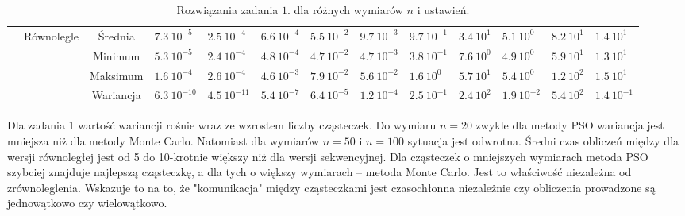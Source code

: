 \documentclass[11pt, a4paper, oneside]{article}
\begin{document}
\begin{table}[h]
\begin{adjustwidth}{-1.76cm}{}
\begin{tabular}{|c|c|c|l|l|l|l|l|l|l|l|l|l|}
                      & \multirow{4}{*}{Równolegle}   & Średnia   & $7.3 \ 10^{-5}$          & $2.5 \ 10^{-4}$         & $6.6 \ 10^{-4}$          & $5.5 \ 10^{-2}$         & $9.7 \ 10^{-3}$          & $9.7 \ 10^{-1}$         & $3.4 \ 10^{1}$           & $5.1 \ 10^{0}$          & $8.2 \ 10^{1}$           & $1.4 \ 10^{1}$          \\ \cline{3-13} 
                      &                               & Minimum   & $5.3 \ 10^{-5}$          & $2.4 \ 10^{-4}$         & $4.8 \ 10^{-4}$          & $4.7 \ 10^{-2}$         & $4.7 \ 10^{-3}$          & $3.8 \ 10^{-1}$         & $7.6 \ 10^{0}$           & $4.9 \ 10^{0}$          & $5.9 \ 10^{1}$           & $1.3 \ 10^{1}$          \\ \cline{3-13} 
                      &                               & Maksimum  & $1.6 \ 10^{-4}$          & $2.6 \ 10^{-4}$         & $4.6 \ 10^{-3}$          & $7.9 \ 10^{-2}$         & $5.6 \ 10^{-2}$          & $1.6 \ 10^{0}$          & $5.7 \ 10^{1}$           & $5.4 \ 10^{0}$          & $1.2 \ 10^{2}$           & $1.5 \ 10^{1}$          \\ \cline{3-13} 
                      &                               & Wariancja & $6.3 \ 10^{-10}$         & $4.5 \ 10^{-11}$        & $5.4 \ 10^{-7}$          & $6.4 \ 10^{-5}$         & $1.2 \ 10^{-4}$          & $2.5 \ 10^{-1}$         & $2.4 \ 10^{2}$           & $1.9 \ 10^{-2}$         & $5.4 \ 10^{2}$           & $1.4 \ 10^{-1}$         \\ \hline
\end{tabular}
\end{adjustwidth}
\caption{Rozwiązania zadania $1$. dla różnych wymiarów $n$ i ustawień.}
\label{tab:rozw_zad1}
\end{table}

Dla zadania 1 wartość wariancji rośnie wraz ze wzrostem liczby cząsteczek. Do wymiaru $n = 20$ zwykle dla metody PSO wariancja jest mniejsza niż dla metody Monte Carlo. Natomiast dla wymiarów $n = 50$ i $n = 100$ sytuacja jest odwrotna. Średni czas obliczeń między dla wersji równoległej jest od 5 do 10-krotnie większy niż dla wersji sekwencyjnej. Dla cząsteczek o mniejszych wymiarach metoda PSO szybciej znajduje najlepszą cząsteczkę, a dla tych o większy wymiarach -- metoda Monte Carlo. Jest to właściwość niezależna od zrównoleglenia. Wskazuje to na to, że "komunikacja" między cząsteczkami jest czasochłonna niezależnie czy obliczenia prowadzone są jednowątkowo czy wielowątkowo.
\end{document}
